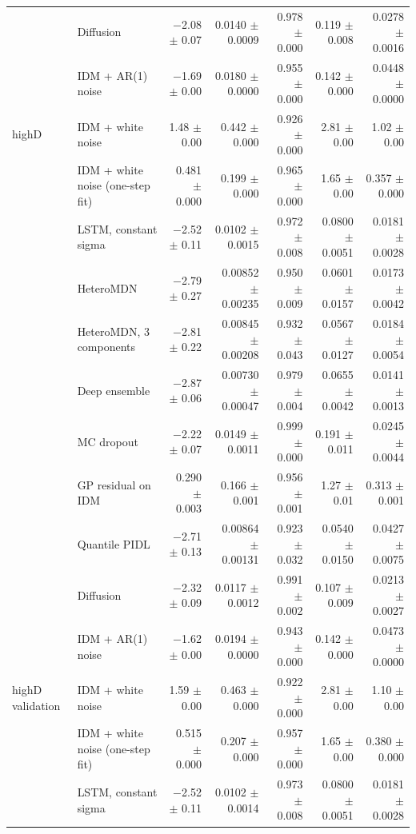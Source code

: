 \begin{longtable}{llrrrrr}
 & Diffusion & $-$2.08 $\pm$ 0.07 & 0.0140 $\pm$ 0.0009 & 0.978 $\pm$ 0.000 & 0.119 $\pm$ 0.008 & 0.0278 $\pm$ 0.0016 \\
 & IDM + AR(1) noise & $-$1.69 $\pm$ 0.00 & 0.0180 $\pm$ 0.0000 & 0.955 $\pm$ 0.000 & 0.142 $\pm$ 0.000 & 0.0448 $\pm$ 0.0000 \\
\midrule
highD & IDM + white noise & 1.48 $\pm$ 0.00 & 0.442 $\pm$ 0.000 & 0.926 $\pm$ 0.000 & 2.81 $\pm$ 0.00 & 1.02 $\pm$ 0.00 \\
 & IDM + white noise (one-step fit) & 0.481 $\pm$ 0.000 & 0.199 $\pm$ 0.000 & 0.965 $\pm$ 0.000 & 1.65 $\pm$ 0.00 & 0.357 $\pm$ 0.000 \\
 & LSTM, constant sigma & $-$2.52 $\pm$ 0.11 & 0.0102 $\pm$ 0.0015 & 0.972 $\pm$ 0.008 & 0.0800 $\pm$ 0.0051 & 0.0181 $\pm$ 0.0028 \\
 & HeteroMDN & $-$2.79 $\pm$ 0.27 & 0.00852 $\pm$ 0.00235 & 0.950 $\pm$ 0.009 & 0.0601 $\pm$ 0.0157 & 0.0173 $\pm$ 0.0042 \\
 & HeteroMDN, 3 components & $-$2.81 $\pm$ 0.22 & 0.00845 $\pm$ 0.00208 & 0.932 $\pm$ 0.043 & 0.0567 $\pm$ 0.0127 & 0.0184 $\pm$ 0.0054 \\
 & Deep ensemble & $-$2.87 $\pm$ 0.06 & 0.00730 $\pm$ 0.00047 & 0.979 $\pm$ 0.004 & 0.0655 $\pm$ 0.0042 & 0.0141 $\pm$ 0.0013 \\
 & MC dropout & $-$2.22 $\pm$ 0.07 & 0.0149 $\pm$ 0.0011 & 0.999 $\pm$ 0.000 & 0.191 $\pm$ 0.011 & 0.0245 $\pm$ 0.0044 \\
 & GP residual on IDM & 0.290 $\pm$ 0.003 & 0.166 $\pm$ 0.001 & 0.956 $\pm$ 0.001 & 1.27 $\pm$ 0.01 & 0.313 $\pm$ 0.001 \\
 & Quantile PIDL & $-$2.71 $\pm$ 0.13 & 0.00864 $\pm$ 0.00131 & 0.923 $\pm$ 0.032 & 0.0540 $\pm$ 0.0150 & 0.0427 $\pm$ 0.0075 \\
 & Diffusion & $-$2.32 $\pm$ 0.09 & 0.0117 $\pm$ 0.0012 & 0.991 $\pm$ 0.002 & 0.107 $\pm$ 0.009 & 0.0213 $\pm$ 0.0027 \\
 & IDM + AR(1) noise & $-$1.62 $\pm$ 0.00 & 0.0194 $\pm$ 0.0000 & 0.943 $\pm$ 0.000 & 0.142 $\pm$ 0.000 & 0.0473 $\pm$ 0.0000 \\
\midrule
highD validation & IDM + white noise & 1.59 $\pm$ 0.00 & 0.463 $\pm$ 0.000 & 0.922 $\pm$ 0.000 & 2.81 $\pm$ 0.00 & 1.10 $\pm$ 0.00 \\
 & IDM + white noise (one-step fit) & 0.515 $\pm$ 0.000 & 0.207 $\pm$ 0.000 & 0.957 $\pm$ 0.000 & 1.65 $\pm$ 0.00 & 0.380 $\pm$ 0.000 \\
 & LSTM, constant sigma & $-$2.52 $\pm$ 0.11 & 0.0102 $\pm$ 0.0014 & 0.973 $\pm$ 0.008 & 0.0800 $\pm$ 0.0051 & 0.0181 $\pm$ 0.0028 \\

\end{longtable}
